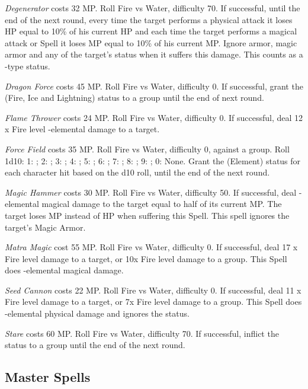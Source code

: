 \begin{multicols}{2}
    \textit{Degenerator} costs 32 MP. Roll Fire vs Water, difficulty 70. If successful, until the end of the next round, every time the target performs a physical attack it loses HP equal to 10\% of his current HP and each time the target performs a magical attack or Spell it loses MP equal to 10\% of his current MP. Ignore armor, magic armor and any of the target’s status when it suffers this damage. This counts as a -type status.
    
    \textit{Dragon Force} costs 45 MP. Roll Fire vs Water, difficulty 0. If successful, grant the  (Fire, Ice and Lightning) status to a group until the end of next round.
    
    \textit{Flame Thrower} costs 24 MP. Roll Fire vs Water, difficulty 0. If successful, deal 12 x Fire level -elemental damage to a target.
    
	\textit{Force Field} costs 35 MP. Roll Fire vs Water, difficulty 0, against a group. Roll 1d10: 1: ; 2: ; 3: ; 4: ; 5: ; 6: ; 7: ; 8: ; 9: ; 0: None. Grant the (Element)  status for each character hit based on the d10 roll, until the end of the next round.
    
    \textit{Magic Hammer} costs 30 MP. Roll Fire vs Water, difficulty 50. If successful, deal -elemental magical damage to the target equal to half of its current MP. The target loses MP instead of HP when suffering this Spell. This spell ignores the target’s Magic Armor.
    
    \textit{Matra Magic} cost 55 MP. Roll Fire vs Water, difficulty 0. If successful, deal 17 x Fire level damage to a target, or 10x Fire level damage to a group. This Spell does -elemental magical damage.

    \textit{Seed Cannon} costs 22 MP. Roll Fire vs Water, difficulty 0. If successful, deal 11 x Fire level damage to a target, or 7x Fire level damage to a group. This Spell does -elemental physical damage and ignores the  status.
    
    \textit{Stare} costs 60 MP. Roll Fire vs Water, difficulty 70. If successful, inflict the  status to a group until the end of the next round.
    
\subsection{Master Spells}


\end{multicols}
